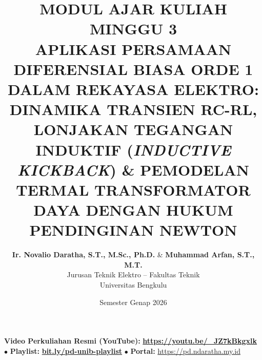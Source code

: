 \documentclass[11pt,a4paper]{article}
\title{\textbf{\Large MODUL AJAR KULIAH MINGGU 3}\\[0.3cm]
\textbf{\LARGE APLIKASI PERSAMAAN DIFERENSIAL BIASA ORDE 1 DALAM REKAYASA ELEKTRO: DINAMIKA TRANSIEN RC-RL, LONJAKAN TEGANGAN INDUKTIF (\textit{INDUCTIVE KICKBACK}) \& PEMODELAN TERMAL TRANSFORMATOR DAYA DENGAN HUKUM PENDINGINAN NEWTON}}
\author{\textbf{Ir. Novalio Daratha, S.T., M.Sc., Ph.D.} \& \textbf{Muhammad Arfan, S.T., M.T.} \\ 
Jurusan Teknik Elektro -- Fakultas Teknik \\ 
Universitas Bengkulu}
\date{Semester Genap 2026}
\theoremstyle{definition}
\begin{document}
\maketitle

\begin{center}
  \vspace{-0.25cm}
  \begin{tcolorbox}[colback=red!4!white,colframe=red!75!black,boxrule=0.5pt,arc=2pt,left=6pt,right=6pt,top=3pt,bottom=3pt,width=0.98\textwidth]
    \centering\footnotesize
    \textbf{Video Perkuliahan Resmi (YouTube):} {\color{red!80!black}\textbf{\url{https://youtu.be/_JZ7kBkgxlk}}} \quad $\bullet$ \quad \textbf{Playlist:} \href{https://www.youtube.com/playlist?list=PLS5oOZWXZeTw}{\color{blue!80!black}\textbf{bit.ly/pd-unib-playlist}} \quad $\bullet$ \quad \textbf{Portal:} \url{https://pd.ndaratha.my.id}
  \end{tcolorbox}
  \vspace{-0.15cm}
\end{center}
\end{document}
